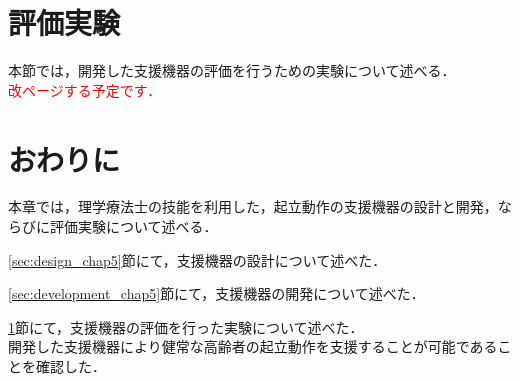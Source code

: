 \section{評価実験}
\label{sec:experiment_chap5}

本節では，開発した支援機器の評価を行うための実験について述べる．\\

\textcolor{red}{改ページする予定です．}

\section{おわりに}
\label{sec:outro_chap5}

本章では，理学療法士の技能を利用した，起立動作の支援機器の設計と開発，ならびに評価実験について述べる．

\ref{sec:design_chap5}節にて，支援機器の設計について述べた．

\ref{sec:development_chap5}節にて，支援機器の開発について述べた．

\ref{sec:experiment_chap5}節にて，支援機器の評価を行った実験について述べた．\\

開発した支援機器により健常な高齢者の起立動作を支援することが可能であることを確認した．

\clearpage
